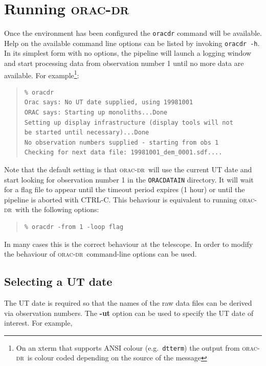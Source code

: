 \documentclass[twoside,11pt]{article}
\newcommand{\xref}[3]{#1}
\newcommand{\xlabel}[1]{}
\renewcommand{\_}{\texttt{\symbol{95}}}
\newcommand{\oracdr}{\xref{\textsc{orac-dr}}{sun230}{}}
\newenvironment{myquote}{\begin{quote}\begin{small}}{\end{small}\end{quote}}
\begin{document}
\section{Running \oracdr\xlabel{running_orac_dr}}

Once the environment has been configured the \texttt{oracdr} command
will be available. Help on the available command line options 
can be listed by invoking \texttt{oracdr -h}. In its simplest
form with no options, the pipeline will launch a logging window and 
start processing data from observation number 1 until no more data are
available. For example\footnote{On an xterm that supports ANSI colour (e.g.\
\texttt{dtterm}) the output from \oracdr\ is colour coded depending on the
source of the message}:

\begin{myquote}
\begin{verbatim}
% oracdr
Orac says: No UT date supplied, using 19981001
ORAC says: Starting up monoliths...Done
Setting up display infrastructure (display tools will not
be started until necessary)...Done
No observation numbers supplied - starting from obs 1
Checking for next data file: 19981001_dem_0001.sdf....
\end{verbatim}
\end{myquote}
Note that the default setting is that \oracdr\ will use the current UT
date and start looking for observation number 1 in the \texttt{ORAC\_DATA\_IN}
directory. It will wait for a flag file to appear until the timeout period expires 
(1 hour) or until the pipeline is aborted with CTRL-C. This behaviour
is equivalent to running \oracdr\ with the following options:
\begin{myquote}
\begin{verbatim}
% oracdr -from 1 -loop flag
\end{verbatim}
\end{myquote}

In many cases this is the correct behaviour at the telescope. In order to
modify the behaviour of \oracdr\ command-line options can be used.

\subsection{Selecting a UT date\xlabel{selecting_a_ut_date}}

The UT date is required so that the names of the raw data files can be
derived via observation numbers. The \textbf{-ut} option can be used
to specify the UT date of interest. For example,
\end{document}
